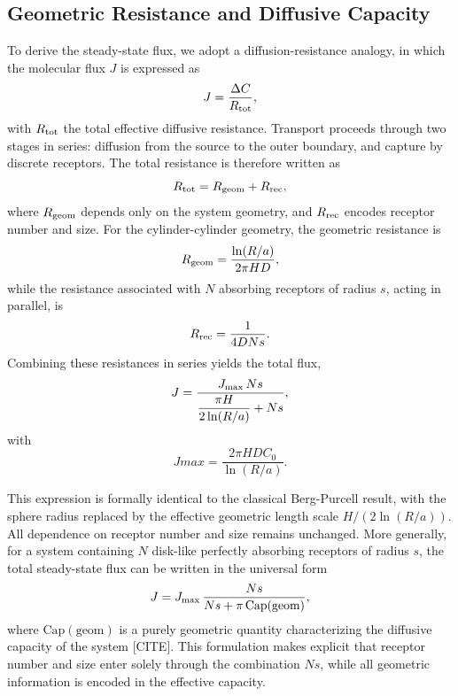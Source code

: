 \subsection{Geometric Resistance and Diffusive Capacity}\label{sec:geom_resistance}
To derive the steady-state flux, we adopt a diffusion-resistance analogy, in which the molecular flux $J$ is expressed as
\begin{equation}
    J = \frac{\Delta C}{R_{\mathrm{tot}}},
    \label{eq:flux_resistance}
\end{equation}
with $R_{\mathrm{tot}}$ the total effective diffusive resistance. Transport proceeds through two stages in series: diffusion from the source to the outer boundary, and capture by discrete receptors. The total resistance is therefore written as
\begin{equation}
    R_{\mathrm{tot}} = R_{\mathrm{geom}} + R_{\mathrm{rec}},
    \label{eq:rtot_geom_rec}
\end{equation}
where $R_{\mathrm{geom}}$ depends only on the system geometry, and $R_{\mathrm{rec}}$ encodes receptor number and size.
For the cylinder-cylinder geometry, the geometric resistance is
\begin{equation}
    R_{\mathrm{geom}} = \frac{\ln(R/a)}{2\pi H D},
    \label{eq:rgeom}
\end{equation}
while the resistance associated with $N$ absorbing receptors of radius $s$, acting in parallel, is
\begin{equation}
    R_{\mathrm{rec}} = \frac{1}{4 D N s}.
    \label{eq:rrec}
\end{equation}
Combining these resistances in series yields the total flux,
\begin{equation}
    J = \frac{J_{\mathrm{max}} \, Ns}{\dfrac{\pi H}{2 \ln(R/a)} + Ns}
    \label{eq:flux_total_BP},
\end{equation}
with
\begin{equation}
    Jmax = \frac{2\pi H D C_{0}}{\ln(R/a)}
    \label{eq:flux_max}.
\end{equation}

This expression is formally identical to the classical Berg-Purcell result, with the sphere radius replaced by the effective geometric length scale $H/(2\ln(R/a))$.
All dependence on receptor number and size remains unchanged.
More generally, for a system containing $N$ disk-like perfectly absorbing receptors of radius $s$, the total steady-state flux can be written in the universal form
\begin{equation}
    J = J_{\mathrm{max}} \, \frac{Ns}{Ns + \pi\,\mathrm{Cap(geom)}},
    \label{eq:flux_universal}
\end{equation}
where $\mathrm{Cap(geom)}$ is a purely geometric quantity characterizing the diffusive capacity of the system [CITE].
This formulation makes explicit that receptor number and size enter solely through the combination $Ns$, while all geometric information is encoded in the effective capacity.

